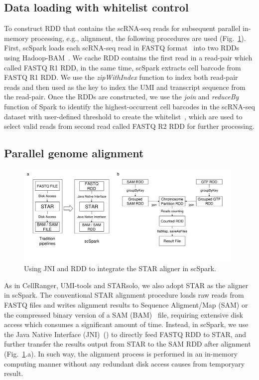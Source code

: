 \documentclass[conference]{IEEEtran}
\begin{document}
\subsection{Data loading with whitelist control}
To construct RDD that contains the scRNA-seq reads for subsequent parallel in-memory processing, e.g., alignment, the following procedures are used (Fig.~\ref{fig1}).
First, scSpark loads each scRNA-seq read in FASTQ format~\cite{cock2010sanger} into two RDDs using Hadoop-BAM~\cite{hadoopBAM}.
We cache RDD contains the first read in a read-pair which called FASTQ R1 RDD, in the same time, scSpark extracts cell barcode from FASTQ R1 RDD.
We use the \textit{zipWithIndex} function to index both read-pair reads and then used as the key to index the UMI and transcript sequence from the read-pair.
Once the RDDs are constructed, we use the \textit{join} and \textit{reduceBy} function of Spark to identify the highest-occurrent cell barcodes in the scRNA-seq dataset with user-defined threshold to create the whitelist~\cite{guo2018bioinformatics}, which are used to select valid reads from second read called FASTQ R2 RDD for further processing. 

\subsection{Parallel genome alignment}
\begin{figure}
\centering
	\includegraphics[width=0.98\textwidth]{fig1.pdf}
	\caption{Using JNI and RDD to integrate the STAR aligner in scSpark.} \label{fig1}
\end{figure}

As in CellRanger, UMI-tools and STARsolo, we also adopt STAR as the aligner in scSpark.
The conventional STAR alignment procedure loads raw reads from FASTQ files and writes alignment results to Sequence Aligment/Map (SAM) or the compressed binary version of a SAM (BAM)~\cite{li2009sequence} file, requiring extensive disk access which consumes a significant amount of time.
Instead, in scSpark, we use the Java Native Interface (JNI)~(\cite{kim2012benchmarking}) to directly feed FASTQ RDD to STAR, and further transfer the results output from STAR to the SAM RDD after alignment (Fig.~\ref{fig1}.a). 
In such way, the alignment process is performed in an in-memory computing manner without any redundant disk access causes from temporyary result. 
\end{document}
